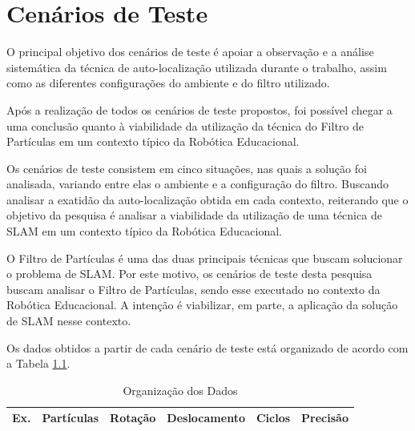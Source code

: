 \chapter[Cenários de Teste]{Cenários de Teste}
\label{sec:cenarios_teste}
O principal objetivo dos cenários de teste é apoiar a observação e a análise sistemática da técnica de auto-localização utilizada durante o trabalho, assim como as diferentes configurações do ambiente e
do filtro utilizado.

Após a realização de todos os cenários de teste propostos, foi possível chegar a uma conclusão quanto à viabilidade da utilização da técnica do Filtro de Partículas em um contexto típico da Robótica Educacional.

Os cenários de teste consistem em cinco situações, nas quais a solução foi analisada, variando entre elas o ambiente e a configuração do filtro. Buscando
analisar a exatidão da auto-localização obtida em cada contexto, reiterando que o objetivo da pesquisa é analisar a viabilidade da utilização
de uma técnica de SLAM em um contexto típico da Robótica Educacional.

O Filtro de Partículas é uma das duas principais técnicas que buscam solucionar o problema
de SLAM. Por este motivo, os cenários de teste desta pesquisa buscam analisar o Filtro de Partículas, sendo esse executado no contexto da Robótica Educacional.
A intenção é viabilizar, em parte, a aplicação da solução de SLAM nesse contexto.

Os dados obtidos a partir de cada cenário de teste está organizado de acordo com a Tabela \ref{tab:org_dados}.

\begin{table}[H]
  \centering
  \caption{Organização dos Dados}
  \label{tab:org_dados}
  \begin{tabular}{|c|c|c|c|c|c|}
  \hline
  \textbf{Ex.} & \textbf{Partículas} & \textbf{Rotação} & \textbf{Deslocamento} & \textbf{Ciclos} & \textbf{Precisão} \\ \hline
  \end{tabular}
\end{table}

